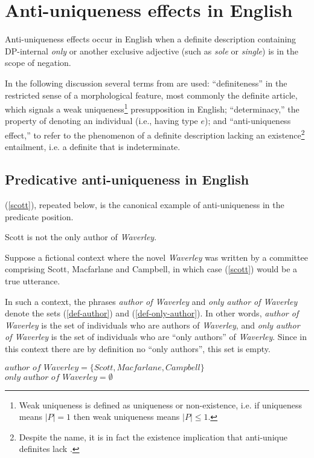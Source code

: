 \section{Anti-uniqueness effects in English \label{sec:anti-unique-en}}
Anti-uniqueness effects occur in English when a definite description containing DP-internal \textit{only} or another exclusive adjective (such as \textit{sole} or \textit{single}) is in the scope of negation.

In the following discussion several terms from \citet{cb2015} are used: ``definiteness'' in the restricted sense of a morphological feature, most commonly the definite article, which signals a weak uniqueness\footnote{Weak uniqueness is defined as uniqueness or non-existence, i.e. if uniqueness means $|P| = 1$ then weak uniqueness means $|P| \le 1$.} presupposition in English; ``determinacy,'' the property of denoting an individual (i.e., having type $e$); and ``anti-uniqueness effect,'' to refer to the phenomenon of a definite description lacking an existence\footnote{Despite the name, it is in fact the existence implication that anti-unique definites lack \citep[p. 385]{cb2015}.} entailment, i.e. a definite that is indeterminate.

\subsection{Predicative anti-uniqueness in English}
(\ref{scott}), repeated below, is the canonical example of anti-uniqueness in the predicate position.

\begin{exe}
	 Scott is not the only author of \textit{Waverley}.
\end{exe}

Suppose a fictional context where the novel \textit{Waverley} was written by a committee comprising Scott, Macfarlane and Campbell, in which case (\ref{scott}) would be a true utterance.

In such a context, the phrases \textit{author of Waverley} and \textit{only author of Waverley} denote the sets (\ref{def-author}) and (\ref{def-only-author}). In other words, \textit{author of Waverley} is the set of individuals who are authors of \textit{Waverley}, and \textit{only author of Waverley} is the set of individuals who are ``only authors'' of \textit{Waverley}. Since in this context there are by definition no ``only authors'', this set is empty.

\begin{exe}
	\ex \label{def-author} $\textit{author of Waverley} = \lbrace Scott, Macfarlane, Campbell \rbrace$
	\ex \label{def-only-author} $\textit{only author of Waverley} = \emptyset$
\end{exe}


